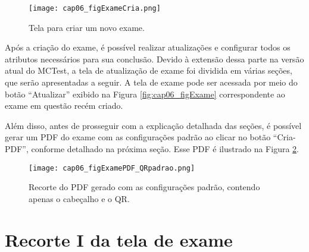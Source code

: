 \begin{figure}[!t]
  \centering
  \texttt{[image: cap06\_figExameCria.png]}
  \caption{Tela para criar um novo exame.}\vspace{-3mm}
  \label{fig:cap06_figExameCria}
\end{figure}


Após a criação do exame, é possível realizar atualizações e configurar todos os atributos necessários para sua conclusão. Devido à extensão dessa parte na versão atual do MCTest, a tela de atualização de exame foi dividida em várias seções, que serão apresentadas a seguir. A tela de exame pode ser acessada por meio do botão ``Atualizar'' exibido na Figura \ref{fig:cap06_figExame} correspondente ao exame em questão recém criado.

Além disso, antes de prosseguir com a explicação detalhada das seções, é possível gerar um PDF do exame com as configurações padrão ao clicar no botão ``Cria-PDF'', conforme detalhado na próxima seção. Esse PDF é ilustrado na Figura \ref{fig:cap06_figExamePDF_QRpadrao}.

\begin{figure}[htbp]
  \centering
  \texttt{[image: cap06\_figExamePDF\_QRpadrao.png]}
  \caption{Recorte do PDF gerado com as configurações padrão, contendo apenas o cabeçalho e o QR.}
  \label{fig:cap06_figExamePDF_QRpadrao}\vspace{-3mm}
\end{figure}

\section{Recorte I da tela de exame}\label{sec:exameRecorte1}

